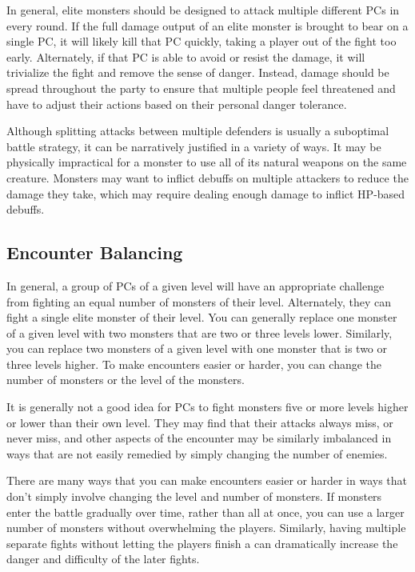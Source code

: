            In general, elite monsters should be designed to attack multiple different PCs in every round.
            If the full damage output of an elite monster is brought to bear on a single PC, it will likely kill that PC quickly, taking a player out of the fight too early.
            Alternately, if that PC is able to avoid or resist the damage, it will trivialize the fight and remove the sense of danger.
            Instead, damage should be spread throughout the party to ensure that multiple people feel threatened and have to adjust their actions based on their personal danger tolerance.

            Although splitting attacks between multiple defenders is usually a suboptimal battle strategy, it can be narratively justified in a variety of ways.
            It may be physically impractical for a monster to use all of its natural weapons on the same creature.
            Monsters may want to inflict debuffs on multiple attackers to reduce the damage they take, which may require dealing enough damage to inflict HP-based debuffs.

    \subsection{Encounter Balancing}\label{Encounter Balancing}
        In general, a group of PCs of a given level will have an appropriate challenge from fighting an equal number of monsters of their level.
        Alternately, they can fight a single elite monster of their level.
        You can generally replace one monster of a given level with two monsters that are two or three levels lower.
        Similarly, you can replace two monsters of a given level with one monster that is two or three levels higher.
        To make encounters easier or harder, you can change the number of monsters or the level of the monsters.

        It is generally not a good idea for PCs to fight monsters five or more levels higher or lower than their own level.
        They may find that their attacks always miss, or never miss, and other aspects of the encounter may be similarly imbalanced in ways that are not easily remedied by simply changing the number of enemies.

        There are many ways that you can make encounters easier or harder in ways that don't simply involve changing the level and number of monsters.
        If monsters enter the battle gradually over time, rather than all at once, you can use a larger number of monsters without overwhelming the players.
        Similarly, having multiple separate fights without letting the players finish a  can dramatically increase the danger and difficulty of the later fights.

